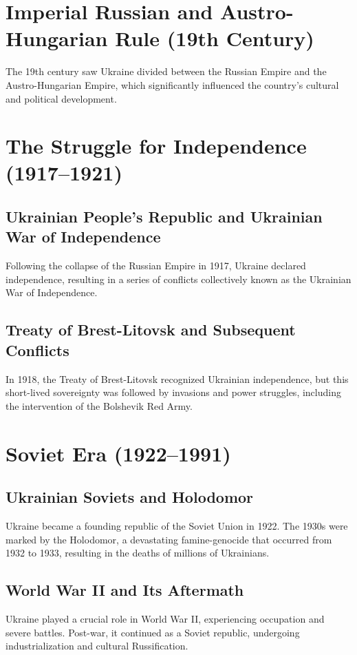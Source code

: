 \documentclass[a4paper,12pt]{book}
\begin{document}
\section{Imperial Russian and Austro-Hungarian Rule (19th Century)}
\label{sec:imperial-russian-austro-hungarian-rule}
The 19th century saw Ukraine divided between the Russian Empire and the Austro-Hungarian Empire, which significantly influenced the country's cultural and political development.

\section{The Struggle for Independence (1917–1921)}
\label{sec:struggle-for-independence}
\subsection{Ukrainian People's Republic and Ukrainian War of Independence}
Following the collapse of the Russian Empire in 1917, Ukraine declared independence, resulting in a series of conflicts collectively known as the Ukrainian War of Independence.

\subsection{Treaty of Brest-Litovsk and Subsequent Conflicts}
In 1918, the Treaty of Brest-Litovsk recognized Ukrainian independence, but this short-lived sovereignty was followed by invasions and power struggles, including the intervention of the Bolshevik Red Army.

\section{Soviet Era (1922–1991)}
\label{sec:soviet-era}
\subsection{Ukrainian Soviets and Holodomor}
Ukraine became a founding republic of the Soviet Union in 1922. The 1930s were marked by the Holodomor, a devastating famine-genocide that occurred from 1932 to 1933, resulting in the deaths of millions of Ukrainians.

\subsection{World War II and Its Aftermath}
Ukraine played a crucial role in World War II, experiencing occupation and severe battles. Post-war, it continued as a Soviet republic, undergoing industrialization and cultural Russification.
\end{document}
